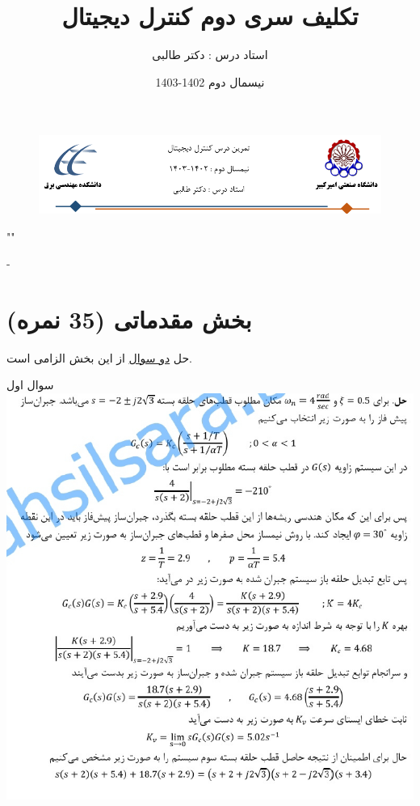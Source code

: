 \documentclass{article}
\title{تکلیف سری دوم کنترل دیجیتال}
\date{نیسمال دوم 1402-1403}
\author{استاد درس : دکتر طالبی}
\begin{document}
\markboth{\theauthor}{\thetitle}



\begin{figure}[htbp]
    \centering
    \includegraphics[width=\linewidth]{Header.png}
\end{figure}

\centering
""

-

\raggedleft
\section{بخش مقدماتی (35 نمره)}
\centering
حل \underline{دو سوال} از این بخش الزامی است.


    \begin{problem}{سوال اول}
    	\includegraphics[width=\linewidth]{Resources/1.png}
   
    \end{problem}
\end{document}
